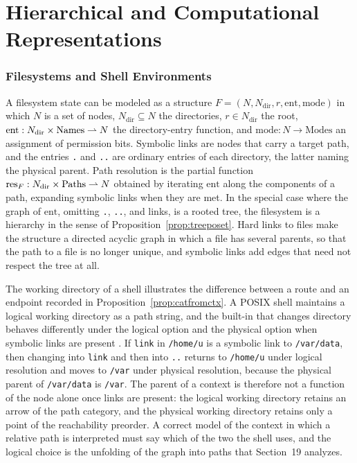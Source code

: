 \part{Hierarchical and Computational Representations}

\section{Filesystems and Shell Environments}

A filesystem state can be modeled as a structure $F=(N,N_{\mathrm{dir}},r,\mathrm{ent},\mathrm{mode})$ in which $N$ is a set of nodes, $N_{\mathrm{dir}}\subseteq N$ the directories, $r\in N_{\mathrm{dir}}$ the root, $\mathrm{ent}:N_{\mathrm{dir}}\times\mathrm{Names}\rightharpoonup N$ the directory-entry function, and $\mathrm{mode}:N\to\mathrm{Modes}$ an assignment of permission bits. Symbolic links are nodes that carry a target path, and the entries \texttt{.} and \texttt{..} are ordinary entries of each directory, the latter naming the physical parent. Path resolution is the partial function $\operatorname{res}_F:N_{\mathrm{dir}}\times\mathrm{Paths}\rightharpoonup N$ obtained by iterating $\mathrm{ent}$ along the components of a path, expanding symbolic links when they are met. In the special case where the graph of $\mathrm{ent}$, omitting \texttt{.}, \texttt{..}, and links, is a rooted tree, the filesystem is a hierarchy in the sense of Proposition~\ref{prop:treeposet}. Hard links to files make the structure a directed acyclic graph in which a file has several parents, so that the path to a file is no longer unique, and symbolic links add edges that need not respect the tree at all.

The working directory of a shell illustrates the difference between a route and an endpoint recorded in Proposition~\ref{prop:catfromctx}. A POSIX shell maintains a logical working directory as a path string, and the built-in that changes directory behaves differently under the logical option and the physical option when symbolic links are present \cite{posix}. If \texttt{link} in \texttt{/home/u} is a symbolic link to \texttt{/var/data}, then changing into \texttt{link} and then into \texttt{..} returns to \texttt{/home/u} under logical resolution and moves to \texttt{/var} under physical resolution, because the physical parent of \texttt{/var/data} is \texttt{/var}. The parent of a context is therefore not a function of the node alone once links are present: the logical working directory retains an arrow of the path category, and the physical working directory retains only a point of the reachability preorder. A correct model of the context in which a relative path is interpreted must say which of the two the shell uses, and the logical choice is the unfolding of the graph into paths that Section~19 analyzes.

